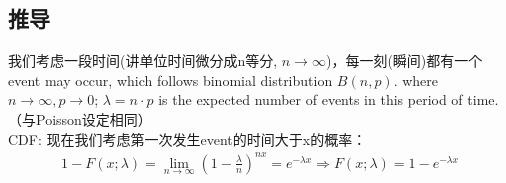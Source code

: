 \documentclass[11pt,a4paper]{article}
\begin{document}
\subsection{推导}
我们考虑一段时间(讲单位时间微分成n等分, $n \rightarrow \infty$)，每一刻(瞬间)都有一个event may occur, which follows binomial distribution $B(n,p)$. where $n \rightarrow \infty, p \rightarrow 0$; $\lambda=n\cdot p$ is the expected number of events in this period of time. （与Poisson设定相同）\\
CDF: 现在我们考虑第一次发生event的时间大于x的概率：
\begin{equation}
    \begin{aligned}
        1-F(x;\lambda)=\lim_{n \rightarrow \infty}(1-\frac{\lambda}{n})^{nx}=e^{-\lambda x}
        \Rightarrow F(x;\lambda)=1-e^{-\lambda x}
    \end{aligned}
    \nonumber
\end{equation}
\end{document}
